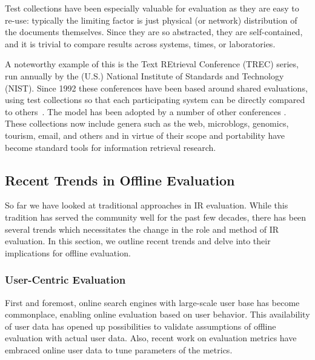 %


Test collections have been especially valuable for evaluation as they are easy to re-use: typically the limiting factor is just physical (or network) distribution of the documents themselves. Since they are so abstracted, they are self-contained, and it is trivial to compare results across systems, times, or laboratories.

A noteworthy example of this is the Text REtrieval Conference (TREC) series, run annually by the (U.S.) National Institute of Standards and Technology (NIST). Since 1992 these conferences have been based around shared evaluations, using test collections so that each participating system can be directly compared to others~\cite{voor:trec05}. The model has been adopted by a number of other conferences . These collections now include genera such as the web, microblogs, genomics, tourism, email, and others and in virtue of their scope and portability have become standard tools for information retrieval research.

\subsection{Recent Trends in Offline Evaluation}

So far we have looked at traditional approaches in IR evaluation. While this tradition has served the community well for the past few decades, there has been several trends which necessitates the change in the role and method of IR evaluation. In this section, we outline recent trends and delve into their implications for offline evaluation.

\subsubsection{User-Centric Evaluation}
First and foremost, online search engines with large-scale user base has become commonplace, enabling online evaluation based on user behavior. This availability of user data has opened up possibilities to validate assumptions of offline evaluation with actual user data. Also, recent work on evaluation metrics \cite{CarteretteKY11, Carterette:2012} have embraced online user data to tune parameters of the metrics.

